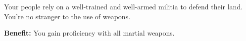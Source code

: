 
Your people rely on a well-trained and well-armed militia to defend their land. You’re no stranger to the use of weapons.

\textbf{Benefit:} You gain proficiency with all martial weapons.